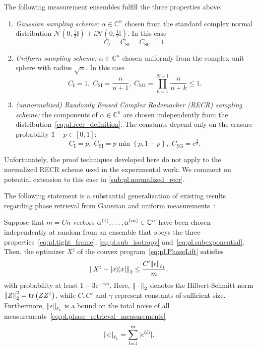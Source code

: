 \begin{proposition}%
  \label{prop:gauss+recr_requirements}
  The following measurement ensembles fulfill the three properties above:
  \begin{enumerate}
    \item \emph{Gaussian sampling scheme:} $\alpha \in \mathbb{C}^n$ chosen from the standard complex normal distribution $\mathcal{N}(0,\tfrac{1}{2}\mathbb{I})+ i \mathcal{N}(0,\tfrac{1}{2}\mathbb{I})$.
    In this case
    \[
      C_\mathrm{I} = C_\mathrm{SI} = C_\mathrm{SG} = 1.
    \]

    \item \emph{Uniform sampling scheme:} $\alpha \in \mathbb{C}^n$ chosen uniformly from the complex unit sphere with radius $\sqrt{n}$.
    In this case
    \[
      C_\mathrm{I} = 1, \; C_\mathrm{SI} = \frac{n}{n+1}, \; C_\mathrm{SG} = \prod_{k=1}^{N-1} \frac{n}{n+k} \leq 1.
    \]

    \item \emph{(unnormalized) Randomly Erased Complex Rademacher (RECR) sampling scheme:} the components of $\alpha \in \mathbb{C}^n$ are chosen independently from the distribution~\eqref{eq:pl.recr_definition}.
    The constants depend only on the erasure probability $1-p \in [0,1]$:
    \[
      C_\mathrm{I} = p,\; C_\mathrm{SI} = p \min \left\{p,1-p \right\}, \; C_\mathrm{SG} = \mathrm{e}^{\frac{3}{2}}.
    \]
  \end{enumerate}
\end{proposition}
Unfortunately, the proof techniques developed here do not apply to the normalized RECR scheme used in the experimental work.
We comment on potential extension to this case in \cref{sub:pl.normalized_recr}.

The following statement is a substantial generalization of existing results regarding phase retrieval from Gaussian and uniform measurements~\cite{Candes_2012_Solving,Demanet_2014_Stable}:
\begin{theorem}%
  \label{thm:pl.phaselift_noisy}
  Suppose that $m = Cn$ vectors $\alpha^{(1)},\ldots,\alpha^{(m)} \in \mathbb{C}^n$ have been chosen independently at random from an ensemble that obeys the three properties~\eqref{eq:pl.tight_frame}, \eqref{eq:pl.sub_isotropy} and~\eqref{eq:pl.subexponential}.
  Then, the optimizer $X^\sharp$ of the convex program~\eqref{eq:pl.PhaseLift} satisfies
  \[
    \fnorm{{X}^\sharp - \ketbra{x}} \leq \frac{C'  \norm{\epsilon}_{\ell_1}}{m}.
    \label{eq:pl.noisy_recovery_bound}
  \]
  with probability at least $1 - 3\mathrm{e}^{-\gamma m}$,
  Here, ${\Vert\cdot\Vert}_{2}$ denotes the Hilbert-Schmitt norm ${\Vert Z\Vert}_{2}^2 = \operatorname{tr} \left( {Z} {Z}^\dagger \right)$, while $C,C'$ and $\gamma$ represent constants of sufficient size.
  Furthermore, ${\Vert\epsilon\Vert}_{\ell_1}$ is a bound on the total noise of all measurements~\eqref{eq:pl.phase_retrieval_measurements}
  \[
    {\Vert\epsilon\Vert}_{\ell_1} = \sum_{l=1}^m {\vert\epsilon^{(l)}\vert}.
  \]
\end{theorem}

